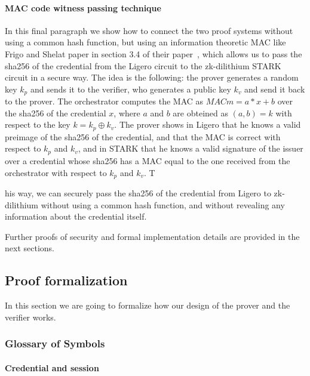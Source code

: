 \documentclass{article}
\begin{document}
\paragraph{MAC code witness passing technique}
In this final paragraph we show how to connect the two proof systems without using a common hash function, 
but using an information theoretic MAC like Frigo and Shelat paper in section 3.4 of their paper~\cite{cryptoeprint:2024/2010}, 
which allows us to pass the sha256 of the credential from the Ligero circuit to the zk-dilithium STARK circuit in a secure way.
The idea is the following: the prover generates a random key $k_p$ and sends it to the verifier,
who generates a public key $k_v$ and send it back to the prover. The orchestrator computes the MAC as $MAC m = a*x + b$ over the
sha256 of the credential $x$, where $a$ and $b$ are obteined as $(a,b) = k$ with respect to the key $k = k_p \oplus k_v$. 
The prover shows in Ligero that he knows a valid preimage of the sha256 of the credential, and that the MAC is correct with respect 
to $k_p$ and $k_v$, and in STARK that he knows a valid signature of the issuer over a credential whose sha256 has a MAC equal to the 
one received from the orchestrator with respect to $k_p$ and $k_v$. T

his way, we can securely pass the sha256 of the credential from Ligero to zk-dilithium without using a common hash function, 
and without revealing any information about the credential itself.

Further proofs of security and formal implementation details are provided in the next sections.

\subsection{Proof formalization}
\label{formalization}
In this section we are going to formalize how our design of the prover and the verifier works.

\subsubsection{Glossary of Symbols}
\label{sec:glossary}

\paragraph*{Credential and session}
\end{document}
